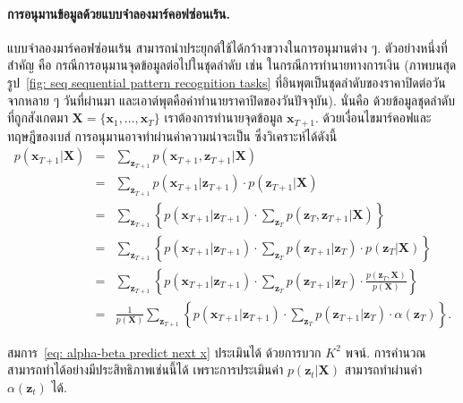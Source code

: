 \paragraph{การอนุมานข้อมูลด้วยแบบจำลองมาร์คอฟซ่อนเร้น.}
แบบจำลองมาร์คอฟซ่อนเร้น สามารถนำประยุกต์ใช้ได้กว้างขวางในการอนุมานต่าง ๆ.
ตัวอย่างหนึ่งที่สำคัญ คือ กรณีการอนุมานจุดข้อมูลต่อไปในชุดลำดับ เช่น ในกรณีการทำนายทางการเงิน (ภาพบนสุด รูป~\ref{fig: seq sequential pattern recognition tasks} ที่อินพุตเป็นชุดลำดับของราคาปิดต่อวัน จากหลาย ๆ วันที่ผ่านมา และเอาต์พุตคือค่าทำนายราคาปิดของวันปัจจุบัน).
นั่นคือ ด้วยข้อมูลชุดลำดับที่ถูกสังเกตมา $\bm{X} = \{\bm{x}_1, \ldots, \bm{x}_T \}$
เราต้องการทำนายจุดข้อมูล $\bm{x}_{T+1}$.
ด้วยเงื่อนไขมาร์คอฟและทฤษฎีของเบส์
การอนุมานอาจทำผ่านค่าความน่าจะเป็น
ซึ่งวิเคราะห์ได้ดังนี้
\begin{eqnarray}
p(\bm{x}_{T+1}|\bm{X}) 
&=& \sum_{\bm{z}_{T+1}} p(\bm{x}_{T+1}, \bm{z}_{T+1}|\bm{X})
\nonumber \\
&=& \sum_{\bm{z}_{T+1}} p(\bm{x}_{T+1}|\bm{z}_{T+1}) \cdot p(\bm{z}_{T+1}|\bm{X})
\nonumber \\
&=& \sum_{\bm{z}_{T+1}} 
\left\{
p(\bm{x}_{T+1}|\bm{z}_{T+1}) \cdot \sum_{\bm{z}_T} p(\bm{z}_T, \bm{z}_{T+1}|\bm{X})
\right\}
\nonumber \\
&=& \sum_{\bm{z}_{T+1}} 
\left\{
p(\bm{x}_{T+1}|\bm{z}_{T+1}) 
\cdot \sum_{\bm{z}_T} p(\bm{z}_{T+1}|\bm{z}_T) \cdot p(\bm{z}_T|\bm{X})
\right\}
\nonumber \\
&=& \sum_{\bm{z}_{T+1}} 
\left\{
p(\bm{x}_{T+1}|\bm{z}_{T+1}) 
\cdot \sum_{\bm{z}_T} p(\bm{z}_{T+1}|\bm{z}_T) \cdot 
\frac{p(\bm{z}_T,\bm{X})}{p(\bm{X})}
\right\}
\nonumber \\
&=& 
\frac{1}{p(\bm{X})}
\sum_{\bm{z}_{T+1}} 
\left\{
p(\bm{x}_{T+1}|\bm{z}_{T+1}) 
\cdot \sum_{\bm{z}_T} p(\bm{z}_{T+1}|\bm{z}_T) \cdot 
\alpha(\bm{z}_T)
\right\}
\label{eq: alpha-beta predict next x} .
\end{eqnarray}

สมการ~\ref{eq: alpha-beta predict next x} ประเมินได้
ด้วยการบวก $K^2$ พจน์.
การคำนวณสามารถทำได้อย่างมีประสิทธิภาพเช่นนี้ได้
เพราะการประเมินค่า $p(\bm{z}_t|\bm{X})$ สามารถทำผ่านค่า $\alpha(\bm{z}_t)$ ได้.

